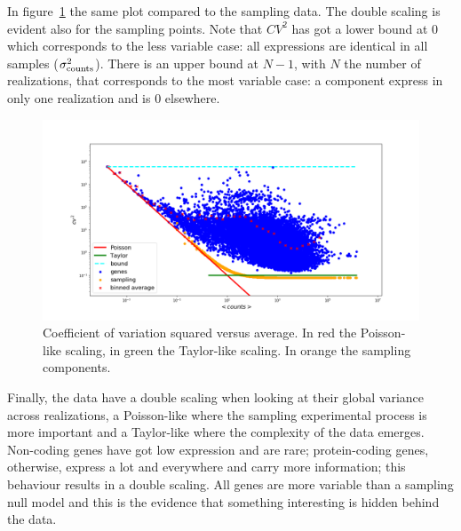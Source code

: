 In figure~\ref{fig:scalinglaws/gtex/cvmean_loglog_sampling} the same plot compared to the sampling data. The double scaling is evident also for the sampling points. Note that $CV^2$ has got a lower bound at $0$ which corresponds to the less variable case: all expressions are identical in all samples ($\sigma^2_{\mathrm{counts}}$). There is an upper bound at $N-1$, with $N$ the number of realizations, that corresponds to the most variable case: a component express in only one realization and is $0$ elsewhere.
\begin{figure}[htb!]
    \centering
    \includegraphics[width=0.9\linewidth]{pictures/scalinglaws/gtex/cvmean_loglog_sampling.png}
    \caption{Coefficient of variation squared versus average. In \textcolor{pythonred}{red} the Poisson-like scaling, in \textcolor{pythongreen}{green} the Taylor-like scaling. In \textcolor{pythonorange}{orange} the sampling components.}
    \label{fig:scalinglaws/gtex/cvmean_loglog_sampling}
\end{figure}

Finally, the data have a double scaling when looking at their global variance across realizations, a Poisson-like where the sampling experimental process is more important and a Taylor-like where the complexity of the data emerges.
Non-coding genes have got low expression and are rare; protein-coding genes, otherwise, express a lot and everywhere and carry more information; this behaviour results in a double scaling. All genes are more variable than a sampling null model and this is the evidence that something interesting is hidden behind the data.
